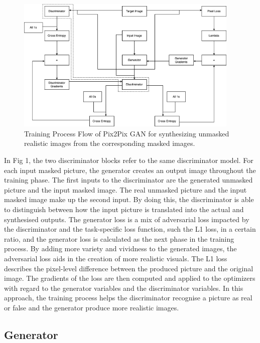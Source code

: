 \documentclass{./styles/svproc}
\begin{document}
\begin{figure}[ht]%
\centering
\includegraphics[width=0.95\textwidth]{figures/training.png}
\caption{Training Process Flow of Pix2Pix GAN for synthesizing unmasked realistic images from the corresponding masked images.}\label{fig1}
\end{figure}

In Fig 1, the two discriminator blocks refer to the same discriminator model. For each input masked picture, the generator creates an output image throughout the training phase. The first inputs to the discriminator are the generated unmasked picture and the input masked image. The real unmasked picture and the input masked image make up the second input. By doing this, the discriminator is able to distinguish between how the input picture is translated into the actual and synthesised outputs. The generator loss is a mix of adversarial loss impacted by the discriminator and the task-specific loss function, such the L1 loss, in a certain ratio, and the generator loss is calculated as the next phase in the training process. By adding more variety and vividness to the generated images, the adversarial loss aids in the creation of more realistic visuals. The L1 loss describes the pixel-level difference between the produced picture and the original image. The gradients of the loss are then computed and applied to the optimizers with regard to the generator variables and the discriminator variables. In this approach, the training process helps the discriminator recognise a picture as real or false and the generator produce more realistic images.

\subsection{Generator}
\end{document}
